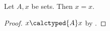 

\begin{proposition}\label{calculation_formation_failure}
    Let $A,x$ be sets.
    Then $x=x$.
\end{proposition}
\begin{proof}
    $x\calctyped{A}x$ by .
\end{proof}
